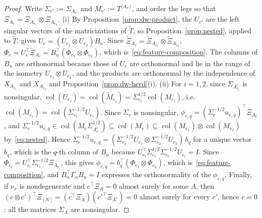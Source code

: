 \documentclass[11pt]{article}
\newcommand{\col}{\operatorname{col}}
\theoremstyle{definition}
\numberwithin{equation}{section}
\begin{document}
\begin{proof}
Write $\Sigma_{e'}:=\Sigma_{A_{e'}}$ and $M_{e'}:=T^{\langle A_{e'}\rangle}$, and order the legs so that $\Xi_{A_e}=\Xi_{A_{e_1}}\otimes\Xi_{A_{e_2}}$. (i) By Proposition~\ref{prop:dw-product}, the $U_{e'}$ are the left singular vectors of the matricizations of $\tilde T$, so Proposition~\ref{prop:nested}, applied to $\tilde T$, gives $U_e=(U_{e_1}\otimes U_{e_2})B_u$. Since $\tilde\Xi_{A_e}=\tilde\Xi_{A_{e_1}}\otimes\tilde\Xi_{A_{e_2}}$, $\Phi_e=U_e^\top\tilde\Xi_{A_e}=B_u^\top(\Phi_{e_1}\otimes\Phi_{e_2})$, which is~\eqref{eq:feature-composition}. The columns of $B_u$ are orthonormal because those of $U_e$ are orthonormal and lie in the range of the isometry $U_{e_1}\otimes U_{e_2}$, and the products are orthonormal by the independence of $X_{A_{e_1}}$ and $X_{A_{e_2}}$ and Proposition~\ref{prop:dw-hsvd}(i). (ii) For $i=1,2$, since $\Sigma_{A_{e_i}^c}$ is nonsingular, $\col(U_{e_i})=\col(\tilde M_{e_i})=\Sigma_{e_i}^{1/2}\col(M_{e_i})$, i.e.\ $\col(M_{e_i})=\col(\Sigma_{e_i}^{-1/2}U_{e_i})$. Since $\Sigma_e$ is nonsingular, $\phi_{e,q}=(\Sigma_e^{-1/2}u_{e,q})^\top\Xi_{A_e}$, and $\Sigma_e^{-1/2}u_{e,q}\in\col(M_e\Sigma_{A_e^c}^{1/2})\subseteq\col(M_e)\subseteq\col(M_{e_1})\otimes\col(M_{e_2})$ by~\eqref{eq:nested}. Hence $\Sigma_e^{-1/2}u_{e,q}=(\Sigma_{e_1}^{-1/2}U_{e_1}\otimes\Sigma_{e_2}^{-1/2}U_{e_2})\,b_q$ for a unique vector $b_q$, which is the $q$-th column of $B_u$ because $U_{e_i}^\top\Sigma_{e_i}^{1/2}\Sigma_{e_i}^{-1/2}U_{e_i}=I$. Since $\Phi_{e_i}=U_{e_i}^\top\Sigma_{e_i}^{-1/2}\Xi_{A_{e_i}}$, this gives $\phi_{e,q}=b_q^\top(\Phi_{e_1}\otimes\Phi_{e_2})$, which is~\eqref{eq:feature-composition}, and $B_u^\top\Gamma_uB_u=I$ expresses the orthonormality of the $\phi_{e,q}$. Finally, if $\nu_x$ is nondegenerate and $c^\top\Xi_A=0$ almost surely for some $A$, then $(c\otimes c')^\top\Xi_{[N]}=(c^\top\Xi_A)(c'^\top\Xi_{A^c})=0$ almost surely for every $c'$, hence $c=0$: all the matrices $\Sigma_A$ are nonsingular.
\end{proof}
\end{document}

